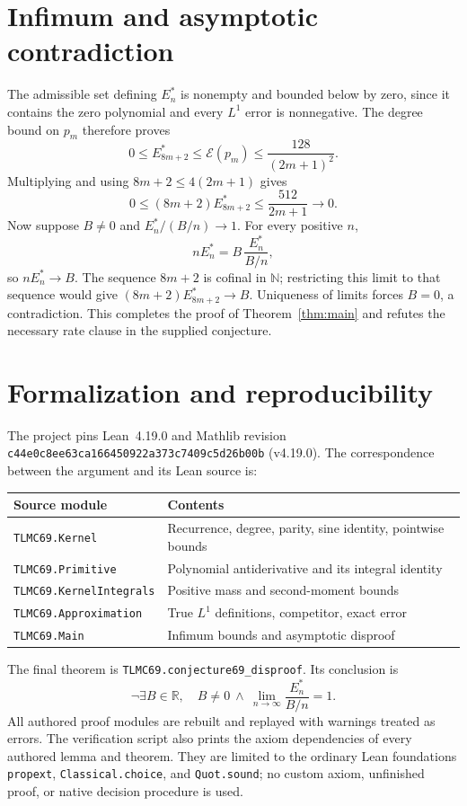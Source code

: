 \documentclass[11pt]{article}
\newcommand{\R}{\mathbb R}
\newcommand{\N}{\mathbb N}
\begin{document}
\section{Infimum and asymptotic contradiction}
The admissible set defining $E_n^*$ is nonempty and bounded below by zero, since it contains the zero polynomial and every $L^1$ error is nonnegative. The degree bound on $p_m$ therefore proves
\[
 0\le E_{8m+2}^*\le\mathcal E(p_m)\le\frac{128}{(2m+1)^2}.
\]
Multiplying and using $8m+2\le4(2m+1)$ gives
\[
 0\le(8m+2)E_{8m+2}^*
 \le\frac{512}{2m+1}\longrightarrow0.
\]
Now suppose $B\ne0$ and $E_n^*/(B/n)\to1$. For every positive $n$,
\[
 nE_n^*=B\,\frac{E_n^*}{B/n},
\]
so $nE_n^*\to B$. The sequence $8m+2$ is cofinal in $\N$; restricting this limit to that sequence would give $(8m+2)E_{8m+2}^*\to B$. Uniqueness of limits forces $B=0$, a contradiction. This completes the proof of Theorem~\ref{thm:main} and refutes the necessary rate clause in the supplied conjecture.

\section{Formalization and reproducibility}
The project pins Lean~4.19.0 and Mathlib revision
\texttt{c44e0c8ee63ca166450922a373c7409c5d26b00b} (v4.19.0).
The correspondence between the argument and its Lean source is:
\begin{center}
\begin{tabular}{ll}
\textbf{Source module} & \textbf{Contents}\\\hline
\texttt{TLMC69.Kernel} & Recurrence, degree, parity, sine identity, pointwise bounds\\
\texttt{TLMC69.Primitive} & Polynomial antiderivative and its integral identity\\
\texttt{TLMC69.KernelIntegrals} & Positive mass and second-moment bounds\\
\texttt{TLMC69.Approximation} & True $L^1$ definitions, competitor, exact error\\
\texttt{TLMC69.Main} & Infimum bounds and asymptotic disproof
\end{tabular}
\end{center}
The final theorem is \texttt{TLMC69.conjecture69\_disproof}. Its conclusion is
\[
 \neg\exists B\in\R,\quad B\ne0\ \land\
 \lim_{n\to\infty}\frac{E_n^*}{B/n}=1.
\]
All authored proof modules are rebuilt and replayed with warnings treated as errors. The verification script also prints the axiom dependencies of every authored lemma and theorem. They are limited to the ordinary Lean foundations \texttt{propext}, \texttt{Classical.choice}, and \texttt{Quot.sound}; no custom axiom, unfinished proof, or native decision procedure is used.
\end{document}
